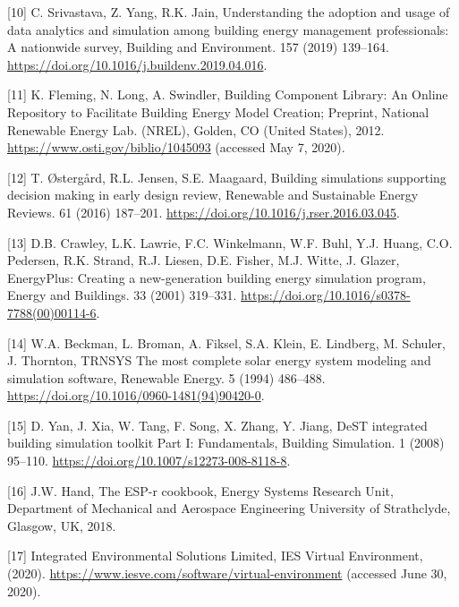 \documentclass[3p, times]{elsarticle} %
\begin{document}
\leavevmode\hypertarget{ref-Srivastava2019}{}%
{[}10{]} C. Srivastava, Z. Yang, R.K. Jain, Understanding the adoption and usage of data analytics and simulation among building energy management professionals: A nationwide survey, Building and Environment. 157 (2019) 139--164. \url{https://doi.org/10.1016/j.buildenv.2019.04.016}.

\leavevmode\hypertarget{ref-Fleming2012}{}%
{[}11{]} K. Fleming, N. Long, A. Swindler, Building Component Library: An Online Repository to Facilitate Building Energy Model Creation; Preprint, National Renewable Energy Lab. (NREL), Golden, CO (United States), 2012. \url{https://www.osti.gov/biblio/1045093} (accessed May 7, 2020).

\leavevmode\hypertarget{ref-Ostergard2016}{}%
{[}12{]} T. Østergård, R.L. Jensen, S.E. Maagaard, Building simulations supporting decision making in early design review, Renewable and Sustainable Energy Reviews. 61 (2016) 187--201. \url{https://doi.org/10.1016/j.rser.2016.03.045}.

\leavevmode\hypertarget{ref-Crawley2001}{}%
{[}13{]} D.B. Crawley, L.K. Lawrie, F.C. Winkelmann, W.F. Buhl, Y.J. Huang, C.O. Pedersen, R.K. Strand, R.J. Liesen, D.E. Fisher, M.J. Witte, J. Glazer, EnergyPlus: Creating a new-generation building energy simulation program, Energy and Buildings. 33 (2001) 319--331. \url{https://doi.org/10.1016/s0378-7788(00)00114-6}.

\leavevmode\hypertarget{ref-Beckman1994}{}%
{[}14{]} W.A. Beckman, L. Broman, A. Fiksel, S.A. Klein, E. Lindberg, M. Schuler, J. Thornton, TRNSYS The most complete solar energy system modeling and simulation software, Renewable Energy. 5 (1994) 486--488. \url{https://doi.org/10.1016/0960-1481(94)90420-0}.

\leavevmode\hypertarget{ref-Yan2008}{}%
{[}15{]} D. Yan, J. Xia, W. Tang, F. Song, X. Zhang, Y. Jiang, DeST integrated building simulation toolkit Part I: Fundamentals, Building Simulation. 1 (2008) 95--110. \url{https://doi.org/10.1007/s12273-008-8118-8}.

\leavevmode\hypertarget{ref-Hand2018}{}%
{[}16{]} J.W. Hand, The ESP-r cookbook, Energy Systems Research Unit, Department of Mechanical and Aerospace Engineering University of Strathclyde, Glasgow, UK, 2018.

\leavevmode\hypertarget{ref-IntegratedEnvironmentalSolutionsLimited2020}{}%
{[}17{]} Integrated Environmental Solutions Limited, IES Virtual Environment, (2020). \url{https://www.iesve.com/software/virtual-environment} (accessed June 30, 2020).
\end{document}
